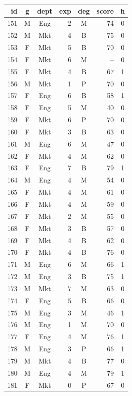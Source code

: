\documentclass[11pt,a4paper]{article}
\renewcommand{\arraystretch}{1.15}
\begin{document}
\begin{center}\scriptsize\setlength{\tabcolsep}{3.5pt}\renewcommand{\arraystretch}{1.0}
\begin{tabular}[t]{@{}r c c r c r c@{}}
\toprule
id & g & dept & exp & deg & score & h \\
\midrule
151 & M & Eng & 2 & M & 74 & 0 \\
152 & M & Mkt & 4 & B & 75 & 0 \\
153 & F & Mkt & 5 & B & 70 & 0 \\
154 & F & Mkt & 6 & M & -- & 0 \\
155 & F & Mkt & 4 & B & 67 & 1 \\
156 & M & Mkt & 1 & P & 70 & 0 \\
157 & F & Eng & 6 & B & 58 & 1 \\
158 & F & Eng & 5 & M & 40 & 0 \\
159 & F & Mkt & 6 & P & 70 & 0 \\
160 & F & Mkt & 3 & B & 63 & 0 \\
161 & M & Eng & 6 & M & 47 & 0 \\
162 & F & Mkt & 4 & M & 62 & 0 \\
163 & F & Eng & 7 & B & 79 & 1 \\
164 & M & Eng & 4 & M & 54 & 0 \\
165 & F & Mkt & 4 & M & 61 & 0 \\
166 & F & Mkt & 4 & M & 59 & 0 \\
167 & F & Mkt & 2 & M & 55 & 0 \\
168 & F & Mkt & 3 & B & 57 & 0 \\
169 & F & Mkt & 4 & B & 62 & 0 \\
170 & F & Mkt & 4 & B & 76 & 0 \\
171 & M & Eng & 6 & M & 66 & 1 \\
172 & M & Eng & 3 & B & 75 & 1 \\
173 & M & Mkt & 7 & M & 63 & 0 \\
174 & F & Eng & 5 & B & 66 & 0 \\
175 & M & Eng & 3 & M & 46 & 1 \\
176 & M & Eng & 1 & M & 70 & 0 \\
177 & F & Eng & 4 & M & 76 & 1 \\
178 & M & Eng & 3 & P & 66 & 1 \\
179 & M & Mkt & 4 & B & 77 & 0 \\
180 & M & Eng & 4 & M & 79 & 1 \\
181 & F & Mkt & 0 & P & 67 & 0 \\

\end{tabular}
\end{center}
\end{document}
